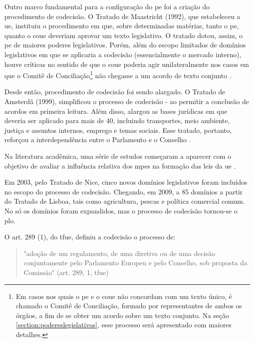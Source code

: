 Outro marco fundamental para a configuração do \acrshort{pe} foi a criação do procedimento de codecisão. O Tratado de Maastricht (1992), que estabeleceu a \acrshort{ue}, instituiu o procedimento em que, sobre determinadas matérias, tanto o \acrshort{pe}, quanto o \acrshort{coue} deveriam aprovar um texto legislativo. O tratado dotou, assim, o \acrshort{pe} de maiores poderes legislativos. Porém, além do escopo limitados de domínios legislativos em que se aplicaria a codecisão (essencialmente o mercado interno), houve críticas no sentido de que o \acrshort{coue} poderia agir unilateralmente nos casos em que o Comitê de Conciliação\footnote{Em casos nos quais o \acrshort{pe} e o \acrshort{coue} não concordam com um texto único, é chamado o Comitê de Conciliação, formado por representantes de ambos os órgãos, a fim de se obter um acordo sobre um texto conjunto. Na seção \ref{section:podereslegislativos}, esse processo será apresentado com maiores detalhes.} não chegasse a um acordo de texto conjunto \cite{crombez_co-decision_1997}.

Desde então, procedimento de codecisão foi sendo alargado. O Tratado de Amsterdã (1999), simplificou o processo de codecisão - ao permitir a conclusão de acordos em primeira leitura. Além disso, alargou as bases jurídicas em que deveria ser aplicado para mais de 40, incluindo transportes, meio ambiente, justiça e assuntos internos, emprego e temas sociais. Esse tratado, portanto, reforçou a interdependência entre o Parlamento e o Conselho \cite{shackleton2003codecision}.

Na literatura acadêmica, uma série de estudos começaram a aparecer com o objetivo de avaliar a influência relativa dos \acrshort{mpe}s na formação das leis da \acrshort{ue} \cite{tsebelis1994power, scully2000democracy, earnshaw1999european, crombez2000understanding, tsebelis2001legislative}.

Em 2003, pelo Tratado de Nice, cinco novos domínios legislativos foram incluídos no escopo do processo de codecisão. Chegando, em 2009, a 85 domínios a partir do Tratado de Lisboa, tais como agricultura, pescas e política comercial comum. No só os domínios foram expandidos, mas o processo de codecisão tornou-se o \acrfull{plo}.

O art. 289 (1), do \acrfull{tfue}, definiu a codecisão o processo de: 
\begin{quote}
    "adoção de um regulamento, de uma diretiva ou de uma decisão conjuntamente pelo Parlamento Europeu e pelo Conselho, sob proposta da Comissão"  (art. 289, 1, \acrshort{tfue})
\end{quote}

